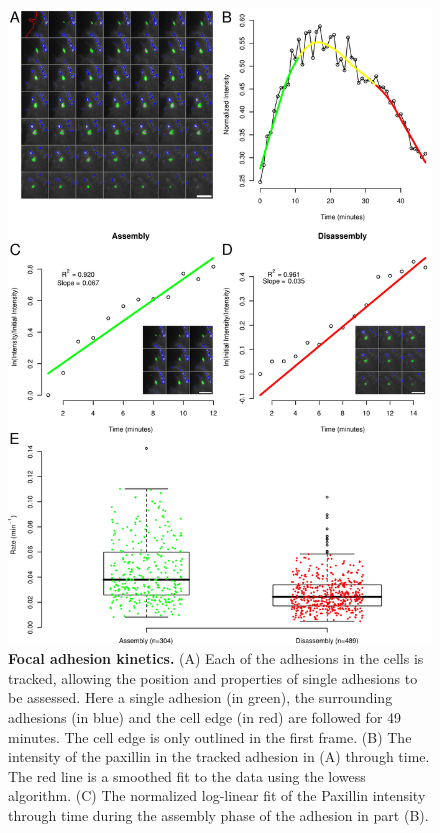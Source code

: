 \begin{figure}[htbp]
\begin{center}
\includegraphics[height=0.8\textheight]{../figures/kinetics/kinetics}
\end{center}
\caption{
{\bf Focal adhesion kinetics.} (A) Each of the adhesions in the cells is
tracked, allowing the position and properties of single adhesions to be
assessed. Here a single adhesion (in green), the surrounding adhesions (in blue)
and the cell edge (in red) are followed for 49 minutes. The cell edge is only
outlined in the first frame. (B) The intensity of the paxillin in the tracked
adhesion in (A) through time. The red line is a smoothed fit to the data using
the lowess algorithm. (C) The normalized log-linear fit of the Paxillin
intensity through time during the assembly phase of the adhesion in part (B).
}
\end{figure}
